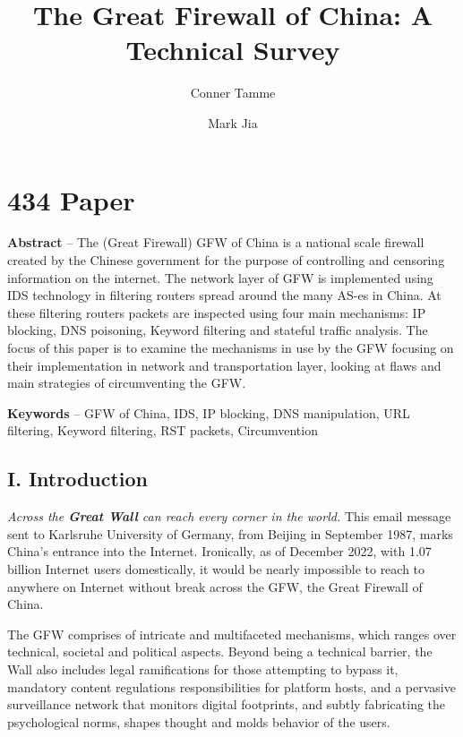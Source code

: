 \documentclass[sigconf]{acmart}
\begin{document}
\title{The Great Firewall of China: A Technical Survey}

\author{Conner Tamme}


\author{Mark Jia}

\hypertarget{paper}{%
\section{434 Paper}\label{paper}}

\textbf{Abstract} -- The (Great Firewall) GFW of China is a national
scale firewall created by the Chinese government for the purpose of
controlling and censoring information on the internet. The network layer
of GFW is implemented using IDS technology in filtering routers spread
around the many AS-es in China. At these filtering routers packets are
inspected using four main mechanisms: IP blocking, DNS poisoning,
Keyword filtering and stateful traffic analysis. The focus of this paper
is to examine the mechanisms in use by the GFW focusing on their
implementation in network and transportation layer, looking at flaws and
main strategies of circumventing the GFW.

\textbf{Keywords} -- GFW of China, IDS, IP blocking, DNS manipulation,
URL filtering, Keyword filtering, RST packets, Circumvention

\hypertarget{i.-introduction}{%
\subsection{I. Introduction}\label{i.-introduction}}

\emph{Across the \textbf{Great Wall} can reach every corner in the
world.} \cite{01_hist1986} This email message sent to Karlsruhe
University of Germany, from Beijing in September 1987, marks China's
entrance into the Internet. Ironically, as of December 2022, with 1.07
billion Internet users domestically, \cite{02_stat2022} it would be
nearly impossible to reach to anywhere on Internet without break across
the GFW, the Great Firewall of China.

The GFW comprises of intricate and multifaceted mechanisms, which ranges
over technical, societal and political aspects. Beyond being a technical
barrier, the Wall also includes legal ramifications for those attempting
to bypass it, mandatory content regulations responsibilities for
platform hosts, and a pervasive surveillance network that monitors
digital footprints, and subtly fabricating the psychological norms,
shapes thought and molds behavior of the users.
\end{document}
